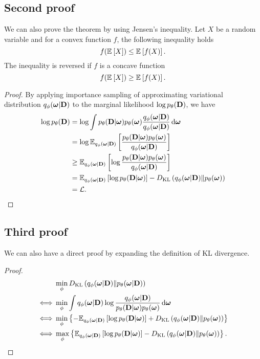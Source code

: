 \documentclass{article}
\begin{document}
\subsection*{Second proof}
We can also prove the theorem by using Jensen's inequality. Let $X$ be a random variable and for a convex function $f$, the following inequality holds
\begin{equation}
	f(\Exp{X}{}) \le \Exp{f(X)}{}.
\end{equation}
The inequality is reversed if $f$ is a concave function
\begin{equation}
	f(\Exp{X}{}) \ge \Exp{f(X)}{}.
\end{equation}
\begin{proof}
	By applying importance sampling of approximating variational distribution $q_{\phi}(\bfomega|\bfD)$ to the marginal likelihood $\log p_{\theta}(\bfD)$, we have
    \begin{align*}
        \log p_{\theta}(\bfD) &= \log \int p_{\theta}(\bfD|\bfomega)p_{\theta}(\bfomega)\frac{q_{\phi}(\bfomega|\bfD)}{q_{\phi}(\bfomega|\bfD)} \dd\bfomega \\
        &= \log \Exp{\frac{p_{\theta}(\bfD|\bfomega)p_{\theta}(\bfomega)}{q_{\phi}(\bfomega|\bfD)}}{q_{\phi}(\bfomega|\bfD)}\\
        &\ge \Exp{\log\frac{p_{\theta}(\bfD|\bfomega)p_{\theta}(\bfomega)}{q_{\phi}(\bfomega|\bfD)}}{q_{\phi}(\bfomega|\bfD)}\\
        &= \Exp{\log p_{\theta}(\bfD|\bfomega)}{q_{\phi}(\bfomega|\bfD)} - \KL{q_{\phi}(\bfomega|\bfD)}{p_{\theta}(\bfomega)} \\
        &= \ccL.
    \end{align*}
\end{proof}
    
\subsection*{Third proof}
We can also have a direct proof by expanding the definition of KL divergence.
\begin{proof}
	\begin{align*}
	    &\min_{\phi} \KL{q_{\phi}(\bfomega|\bfD)}{p_{\theta}(\bfomega|\bfD)}\\
	    \iff
	    &\min_{\phi}\int q_{\phi}(\bfomega|\bfD)\log\frac{q_{\phi}(\bfomega|\bfD)}{p_{\theta}(\bfD|\bfomega)p_{\theta}(\bfomega)}\dd\bfomega\\
	    \iff
	    &\min_{\phi}\left\{ -\Exp{\log p_{\theta}(\bfD|\bfomega)}{q_{\phi}(\bfomega|\bfD)} + \KL{q_{\phi}(\bfomega|\bfD)}{p_{\theta}(\bfomega)} \right\} \\
	    \iff
	    &\max_{\phi}\left\{ \Exp{\log p_{\theta}(\bfD|\bfomega)}{q_{\phi}(\bfomega|\bfD)} - \KL{q_{\phi}(\bfomega|\bfD)}{p_{\theta}(\bfomega)} \right\}.
	\end{align*}
\end{proof}
    
\printbibliography
\end{document}
